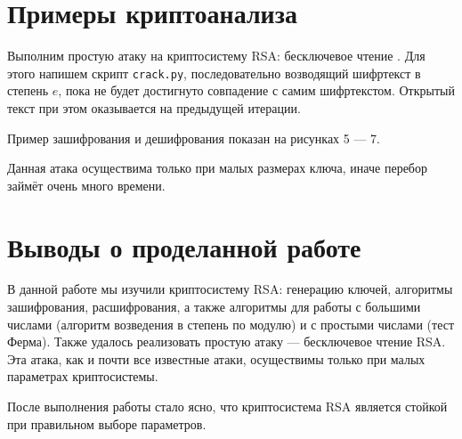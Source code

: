 \section{Примеры криптоанализа}
Выполним простую атаку на криптосистему RSA: бесключевое чтение \cite{rsa_attack}. Для этого напишем скрипт \verb|crack.py|, последовательно возводящий шифртекст в степень $e$, пока не будет достигнуто совпадение с самим шифртекстом. Открытый текст при этом оказывается на предыдущей итерации. 

Пример зашифрования и дешифрования показан на рисунках 5 — 7.  

Данная атака осуществима только при малых размерах ключа, иначе перебор займёт очень много времени.

\newpage



\section{Выводы о проделанной работе}
В данной работе мы изучили криптосистему RSA: генерацию ключей, алгоритмы зашифрования, расшифрования, а также алгоритмы для работы с большими числами (алгоритм возведения в степень по модулю) и с простыми числами (тест Ферма). Также удалось реализовать простую атаку — бесключевое чтение RSA. Эта атака, как и почти все известные атаки, осуществимы только при малых параметрах криптосистемы.

После выполнения работы стало ясно, что криптосистема RSA является стойкой при правильном выборе параметров. 
